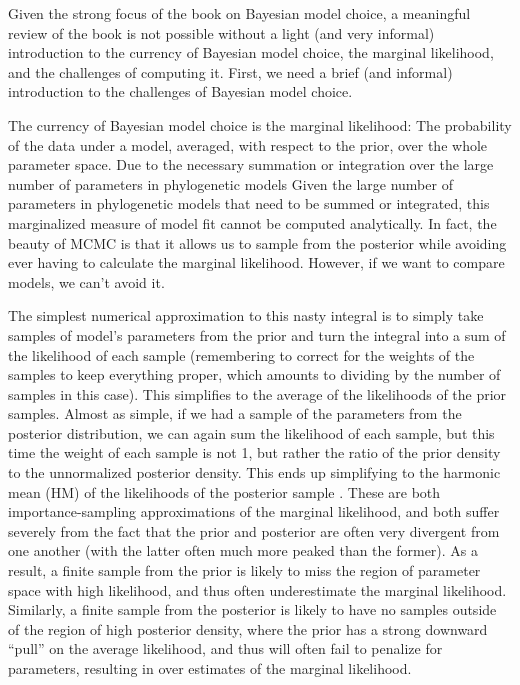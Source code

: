 \documentclass[letterpaper,12pt]{article}
\begin{document}
Given the strong focus of the book on Bayesian model choice, a meaningful
review of the book is not possible without a light (and very informal)
introduction to the currency of Bayesian model choice, the marginal likelihood,
and the challenges of computing it.
First, we need a brief (and informal) introduction to the challenges
of Bayesian model choice.

The currency of Bayesian model choice is the marginal likelihood: The
probability of the data under a model, averaged, with respect to the prior,
over the whole parameter space.
Due to the necessary summation or integration over the large number of parameters
in phylogenetic models
Given the large number of parameters in phylogenetic models that need
to be summed or integrated, this marginalized measure of model fit cannot
be computed analytically.
In fact, the beauty of MCMC is that it allows us to sample from the posterior
while avoiding ever having to calculate the marginal likelihood.
However, if we want to compare models, we can't avoid it.

The simplest numerical approximation to this nasty integral is to simply take
samples of model's parameters from the prior and turn the integral into a sum
of the likelihood of each sample (remembering to correct for the weights of the
samples to keep everything proper, which amounts to dividing by the number of
samples in this case).
This simplifies to the average of the likelihoods of the prior samples.
Almost as simple, if we had a sample of the parameters from the posterior
distribution, we can again sum the likelihood of each sample, but this time the
weight of each sample is not 1, but rather the ratio of the prior density to
the unnormalized posterior density.
This ends up simplifying to the harmonic mean (HM) of the likelihoods of the
posterior sample \citep{Newton1994}.
These are both importance-sampling approximations of the marginal likelihood,
and both suffer severely from the fact that the prior and posterior are often
very divergent from one another (with the latter often much more peaked than
the former).
As a result, a finite sample from the prior is likely to miss the
region of parameter space with high likelihood, and thus often
underestimate the marginal likelihood.
Similarly, a finite sample from the posterior is likely to have no samples
outside of the region of high posterior density, where the prior has a strong
downward ``pull'' on the average likelihood, and thus will often fail to
penalize for parameters, resulting in over estimates of the marginal
likelihood.
\end{document}
